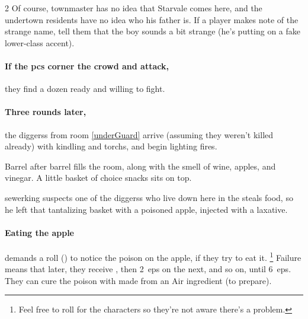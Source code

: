 \begin{multicols}{2}
Of course, \gls{townmaster} has no idea that Starvale comes here, and the
undertown residents have no idea who his father is.  If a player makes note of
the strange name, tell them that the boy sounds a bit strange (he's putting on
a fake lower-class accent).

\paragraph{If the \glspl{pc} corner the crowd and attack,}
they find a dozen ready and willing to fight.

\sewerking



\paragraph{Three rounds later,}
the \glspl{diggers} from room \ref{underGuard} arrive (assuming they weren't killed already) with kindling and \glspl{torch}, and begin lighting fires.


\begin{boxtext}
  Barrel after barrel fills the room, along with the smell of wine, apples, and vinegar.
  A little basket of choice snacks sits on top.
\end{boxtext}

\begin{exampletext}
  \Gls{sewerking} suspects one of the \glspl{diggers} who live down here in the  steals food, so he left that tantalizing basket with a poisoned apple, injected with a laxative.
\end{exampletext}

\paragraph{Eating the apple}
demands a  roll (\tn[11]) to notice the poison on the apple, if they try to eat it.%
\footnote{Feel free to roll for the characters so they're not aware there's a problem.}
Failure means that  later, they receive , then 2~\glspl{ep} on the next, and so on, until 6~\glspl{ep}.
They can cure the poison with  made from an Air \gls{ingredient} (\tn[10] to prepare).


\end{multicols}
